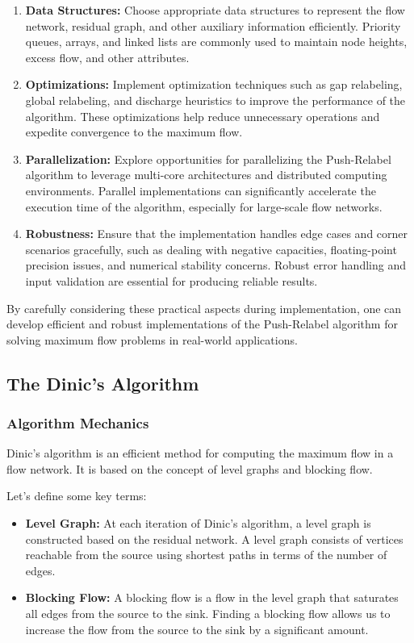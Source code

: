 \documentclass[12pt]{book} %
\begin{document}
\begin{enumerate}
    \item \textbf{Data Structures:} Choose appropriate data structures to represent the flow network, residual graph, and other auxiliary information efficiently. Priority queues, arrays, and linked lists are commonly used to maintain node heights, excess flow, and other attributes.
    
    \item \textbf{Optimizations:} Implement optimization techniques such as gap relabeling, global relabeling, and discharge heuristics to improve the performance of the algorithm. These optimizations help reduce unnecessary operations and expedite convergence to the maximum flow.
    
    \item \textbf{Parallelization:} Explore opportunities for parallelizing the Push-Relabel algorithm to leverage multi-core architectures and distributed computing environments. Parallel implementations can significantly accelerate the execution time of the algorithm, especially for large-scale flow networks.
    
    \item \textbf{Robustness:} Ensure that the implementation handles edge cases and corner scenarios gracefully, such as dealing with negative capacities, floating-point precision issues, and numerical stability concerns. Robust error handling and input validation are essential for producing reliable results.
\end{enumerate}

By carefully considering these practical aspects during implementation, one can develop efficient and robust implementations of the Push-Relabel algorithm for solving maximum flow problems in real-world applications.

\subsection{The Dinic's Algorithm}

\subsubsection{Algorithm Mechanics}
Dinic's algorithm is an efficient method for computing the maximum flow in a flow network. It is based on the concept of level graphs and blocking flow.

Let's define some key terms:

\begin{itemize}
    \item \textbf{Level Graph:} At each iteration of Dinic's algorithm, a level graph is constructed based on the residual network. A level graph consists of vertices reachable from the source using shortest paths in terms of the number of edges.
    
    \item \textbf{Blocking Flow:} A blocking flow is a flow in the level graph that saturates all edges from the source to the sink. Finding a blocking flow allows us to increase the flow from the source to the sink by a significant amount.
\end{itemize}
\end{document}
